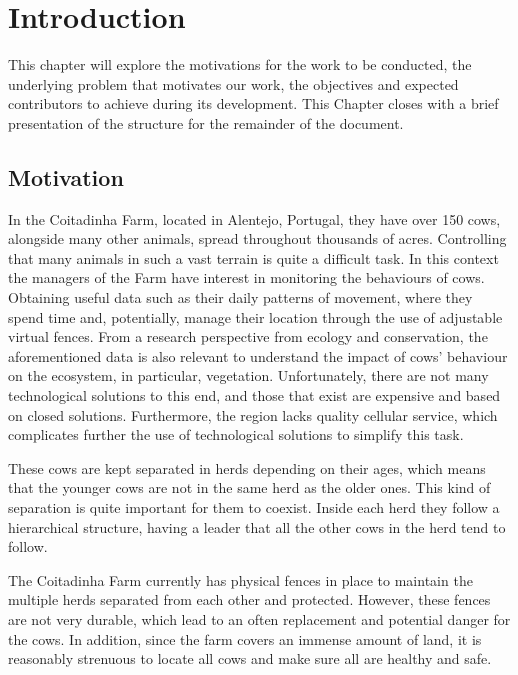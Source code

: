 
%

\chapter{Introduction}
\label{cha:introduction}
This chapter will explore the motivations for the work to be conducted, the underlying
problem that motivates our work, the objectives and expected contributors to achieve during
its development. This Chapter closes with a brief presentation of the structure for the
remainder of the document.

\section{Motivation}
\label{sec:motivation}
In the Coitadinha Farm, located in Alentejo, Portugal, they have over 150 cows,
alongside many other animals, spread throughout thousands of acres. Controlling that many
animals in such a vast terrain is quite a difficult task. In this context the managers of the
Farm have interest in monitoring the behaviours of cows. Obtaining useful data such as their
daily patterns of movement, where they spend time and, potentially, manage their location
through the use of adjustable virtual fences. From a research perspective from ecology and
conservation, the aforementioned data is also relevant to understand the impact of cows'
behaviour on the ecosystem, in particular, vegetation. Unfortunately, there are not many
technological solutions to this end, and those that exist are expensive and based on
closed solutions. Furthermore, the region lacks quality cellular service, which complicates
further the use of technological solutions to simplify this task.

These cows are kept separated in herds depending on their ages, which means that the younger
cows are not in the same herd as the older ones. This kind of separation is quite important
for them to coexist. Inside each herd they follow a hierarchical structure, having a leader
that all the other cows in the herd tend to follow.

The Coitadinha Farm currently has physical fences in place to maintain the multiple
herds separated from each other and protected. However, these fences are not very durable,
which lead to an often replacement and potential danger for the cows. In addition, since the
farm covers an immense amount of land, it is reasonably strenuous to locate all cows and make
sure all are healthy and safe.

